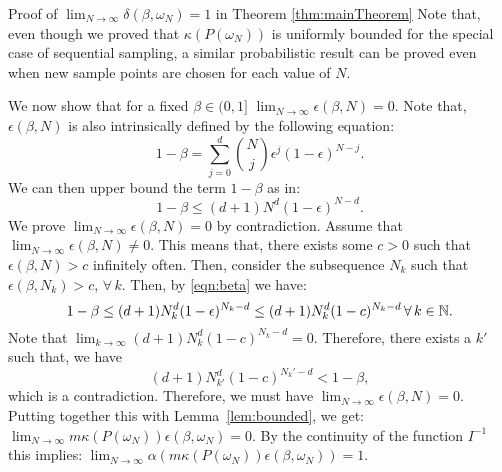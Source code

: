 \begin{subsection}{Proof of  $\lim_{N \to \infty}\delta(\beta, \omega_N) = 1$ in Theorem \ref{thm:mainTheorem}}
Note that, even though we proved that $\kappa(P(\omega_N))$ is uniformly bounded for the special case of sequential sampling, a similar probabilistic result can be proved even when new sample points are chosen for each value of $N$.

We now show that for a fixed $\beta \in (0,1]$ $\lim_{N \to \infty} \epsilon(\beta, N) = 0.$ Note that, $\epsilon(\beta, N)$ is also intrinsically defined by the following equation:
$$1-\beta = \sum_{j=0}^d {{N}\choose{j}} \epsilon^j (1-\epsilon)^{N-j}.$$
We can then upper bound the term $1-\beta$ as in:
\begin{equation}\label{eqn:beta}1-\beta \leq  (d+1)N^d (1-\epsilon)^{N-d}.\end{equation}
We prove $\lim_{N \to \infty} \epsilon(\beta, N) = 0$ by contradiction. Assume that $\lim_{N \to \infty} \epsilon(\beta, N) \not= 0$. This means that, there exists some $c > 0$ such that $\epsilon(\beta, N) > c$ infinitely often. Then, consider the subsequence $N_k$ such that $\epsilon(\beta, N_k) > c$, $\forall\, k.$ Then, by \eqref{eqn:beta} we have:
\begin{equation*}1-\beta\leq  (d+1)N_k^d (1-\epsilon)^{N_k-d} \leq (d+1)N_k^d (1-c)^{N_k-d}\, \forall\,k \in \mathbb{N}. 
\end{equation*}
Note that $\lim_{k \to \infty}(d+1)N_k^d (1-c)^{N_k-d} = 0.$ Therefore, there exists a $k'$ such that, we have $$(d+1)N_{k'}^d (1-c)^{N_k'-d} < 1 - \beta,$$ which is a contradiction. Therefore, we must have  $\lim_{N \to \infty} \epsilon (\beta, N) = 0$. Putting together this with Lemma~\ref{lem:bounded}, we get:
\mbox{$\lim_{N \to \infty} m \kappa(P(\omega_N))\epsilon(\beta, \omega_N) = 0.$} By the continuity of the function $I^{-1}$ this implies: $\lim_{N \to \infty} \alpha(m \kappa(P(\omega_N))\epsilon(\beta, \omega_N)) = 1.$
\end{subsection}



